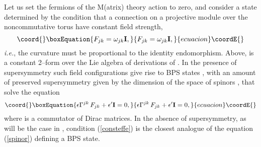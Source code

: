 \documentclass[a4paper,a4paper]{article}
\begin{document}
Let us set the fermions of the M(atrix) theory action to zero, 
and consider a state determined by the condition that a connection on a 
projective module over the noncommutative torus \coordHE{} 
have constant field strength,  
\begin{equation}\coord{}\boxEquation{  
F_{jk}=\omega_{jk}{\bf  I},  
\label{consteffe}
}{  
F_{jk}=\omega_{jk}{\bf  I},  
}{ecuacion}\coordE{}\end{equation}  
{\it i.e.}, the curvature must be proportional to the identity endomorphism.  
Above, \coordHE{} is a constant 2--form over the Lie algebra of  
derivations of \coordHE{}. In the presence of supersymmetry such field   
configurations give rise to BPS states \cite{CDS, SCHWARZ}, with an amount of preserved   
supersymmetry given by the dimension of the space of spinors \myHighlight{$\epsilon$}\coordHE{}, 
\coordHE{} that solve the equation  
\begin{equation}\coord{}\boxEquation{  
\epsilon\Gamma^{jk}\, F_{jk} + \epsilon' {\bf  I}=0,  
\label{spinor}
}{  
\epsilon\Gamma^{jk}\, F_{jk} + \epsilon' {\bf  I}=0,  
}{ecuacion}\coordE{}\end{equation}  
where \coordHE{} is a commutator of Dirac matrices. 
In the absence of supersymmetry, as will be the case in \coordHE{}, 
condition (\ref{consteffe}) is the closest analogue 
of the equation (\ref{spinor}) defining a BPS state.  
  
\end{document}
